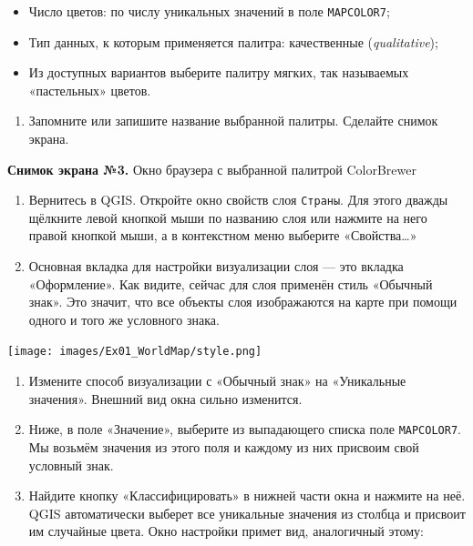 \documentclass[
  12pt,
]{book}
\providecommand{\tightlist}{%
  \setlength{\itemsep}{0pt}\setlength{\parskip}{0pt}}
\begin{document}
\begin{itemize}
\tightlist
\item
  Число цветов: по числу уникальных значений в поле \texttt{MAPCOLOR7};
\item
  Тип данных, к которым применяется палитра: качественные (\emph{qualitative});
\item
  Из доступных вариантов выберите палитру мягких, так называемых «пастельных» цветов.
\end{itemize}

\begin{enumerate}
\def\labelenumi{\arabic{enumi}.}
\setcounter{enumi}{3}
\tightlist
\item
  Запомните или запишите название выбранной палитры. Сделайте снимок экрана.
\end{enumerate}

\textbf{Снимок экрана №3.} Окно браузера с выбранной палитрой ColorBrewer

\begin{enumerate}
\def\labelenumi{\arabic{enumi}.}
\setcounter{enumi}{4}
\item
  Вернитесь в QGIS. Откройте окно свойств слоя \texttt{Страны}. Для этого дважды щёлкните левой кнопкой мыши по названию слоя или нажмите на него правой кнопкой мыши, а в контекстном меню выберите «Свойства\ldots»
\item
  Основная вкладка для настройки визуализации слоя --- это вкладка «Оформление». Как видите, сейчас для слоя применён стиль «Обычный знак». Это значит, что все объекты слоя изображаются на карте при помощи одного и того же условного знака.
\end{enumerate}

\texttt{[image: images/Ex01\_WorldMap/style.png]}

\begin{enumerate}
\def\labelenumi{\arabic{enumi}.}
\setcounter{enumi}{6}
\item
  Измените способ визуализации с «Обычный знак» на «Уникальные значения». Внешний вид окна сильно изменится.
\item
  Ниже, в поле «Значение», выберите из выпадающего списка поле \texttt{MAPCOLOR7}. Мы возьмём значения из этого поля и каждому из них присвоим свой условный знак.
\item
  Найдите кнопку «Классифицировать» в нижней части окна и нажмите на неё. QGIS автоматически выберет все уникальные значения из столбца и присвоит им случайные цвета. Окно настройки примет вид, аналогичный этому:
\end{enumerate}
\end{document}
